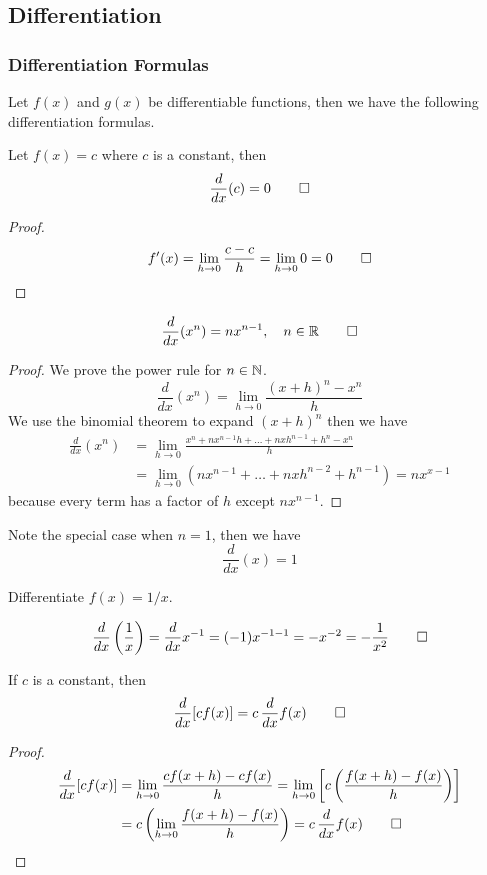 \subsection{Differentiation}
\subsubsection{Differentiation Formulas}
Let \(f(x)\) and \(g(x)\) be differentiable functions, then we have the
following differentiation formulas.
\begin{theorem}
    Let \(f(x)=c\) where \(c\) is a constant, then
    \[\frac{d}{dx}(c)=0 \qedhere\]
\end{theorem}
\begin{proof}
    \[f'(x)=\lim_{h\to 0}\frac{c-c}{h}=\lim_{h\to 0}0=0 \qedhere\]
\end{proof}
\begin{theorem}
    \[\frac{d}{dx}(x^n)=nx^{n-1},\quad n\in\mathbb{R} \qedhere\]
\end{theorem}
\begin{proof}
    We prove the power rule for \(n\in\mathbb{N}\).
    \[\frac{d}{dx}(x^n)=\lim_{h\to 0}\frac{(x+h)^n-x^n}{h}\]
    We use the binomial theorem to expand \((x+h)^n\) then we have
    \begin{align*}
        \frac{d}{dx}(x^n)
        &= \lim_{h\to 0}\frac{x^n+nx^{n-1}h+\dots+nxh^{n-1}+h^n-x^n}{h} \\
        &= \lim_{h\to 0}(nx^{n-1}+\dots+nxh^{n-2}+h^{n-1})=nx^{x-1}
    \end{align*}
    because every term has a factor of \(h\) except \(nx^{n-1}\).
\end{proof}
Note the special case when \(n=1\), then we have \[\frac{d}{dx}(x)=1\]
\begin{problem}
    Differentiate \(f(x)=1/x\).
\end{problem}
\begin{solution}
    \[\frac{d}{dx}\left(\frac{1}{x}\right)=\frac{d}{dx}x^{-1}=(-1)x^{-1-1}
    =-x^{-2}=-\frac{1}{x^2} \qedhere\]
\end{solution}
\begin{theorem}
    If \(c\) is a constant, then
    \[\frac{d}{dx}[cf(x)]=c\,\frac{d}{dx}f(x) \qedhere\]
\end{theorem}
\begin{proof}
    \begin{align*}
        \frac{d}{dx}[cf(x)]&= \lim_{h\to 0}\frac{cf(x+h)-cf(x)}{h}
        =\lim_{h\to 0}\left[c\left(\frac{f(x+h)-f(x)}{h}\right)\right] \\
        &= c\left(\lim_{h\to 0}\frac{f(x+h)-f(x)}{h}\right)
        =c\,\frac{d}{dx}f(x) \qedhere
    \end{align*}
\end{proof}
